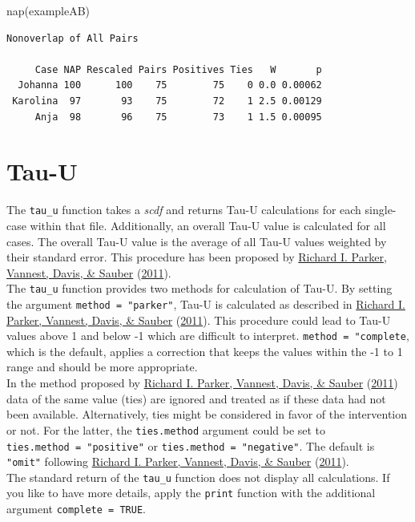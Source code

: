 \documentclass[
]{book}
\newenvironment{Shaded}{\begin{snugshade}}{\end{snugshade}}
\newcommand{\FunctionTok}[1]{\textcolor[rgb]{0.00,0.00,0.00}{#1}}
\newcommand{\NormalTok}[1]{#1}
\begin{document}
\begin{Shaded}
\begin{Highlighting}[]
\FunctionTok{nap}\NormalTok{(exampleAB)}
\end{Highlighting}
\end{Shaded}

\begin{verbatim}
Nonoverlap of All Pairs

     Case NAP Rescaled Pairs Positives Ties   W       p
  Johanna 100      100    75        75    0 0.0 0.00062
 Karolina  97       93    75        72    1 2.5 0.00129
     Anja  98       96    75        73    1 1.5 0.00095
\end{verbatim}

\hypertarget{tau-u}{%
\section{Tau-U}\label{tau-u}}

The \texttt{tau\_u} function takes a \emph{scdf} and returns Tau-U calculations for each single-case within that file. Additionally, an overall Tau-U value is calculated for all cases. The overall Tau-U value is the average of all Tau-U values weighted by their standard error. This procedure has been proposed by \protect\hyperlink{ref-parker_combining_2011}{Richard I. Parker, Vannest, Davis, \& Sauber} (\protect\hyperlink{ref-parker_combining_2011}{2011}).\\
The \texttt{tau\_u} function provides two methods for calculation of Tau-U. By setting the argument \texttt{method\ =\ "parker"}, Tau-U is calculated as described in \protect\hyperlink{ref-parker_combining_2011}{Richard I. Parker, Vannest, Davis, \& Sauber} (\protect\hyperlink{ref-parker_combining_2011}{2011}). This procedure could lead to Tau-U values above 1 and below -1 which are difficult to interpret. \texttt{method\ =\ "complete}, which is the default, applies a correction that keeps the values within the -1 to 1 range and should be more appropriate.\\
In the method proposed by \protect\hyperlink{ref-parker_combining_2011}{Richard I. Parker, Vannest, Davis, \& Sauber} (\protect\hyperlink{ref-parker_combining_2011}{2011}) data of the same value (ties) are ignored and treated as if these data had not been available. Alternatively, ties might be considered in favor of the intervention or not. For the latter, the \texttt{ties.method} argument could be set to \texttt{ties.method\ =\ "positive"} or \texttt{ties.method\ =\ "negative"}. The default is \texttt{"omit"} following \protect\hyperlink{ref-parker_combining_2011}{Richard I. Parker, Vannest, Davis, \& Sauber} (\protect\hyperlink{ref-parker_combining_2011}{2011}).\\
The standard return of the \texttt{tau\_u} function does not display all calculations. If you like to have more details, apply the \texttt{print} function with the additional argument \texttt{complete\ =\ TRUE}.
\end{document}
